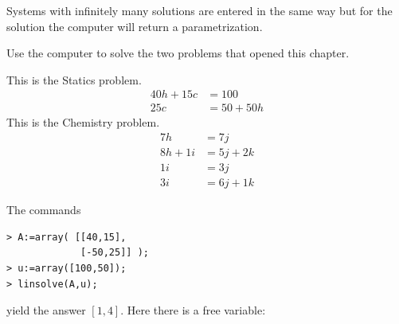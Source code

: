 Systems with infinitely many solutions are entered in the same
way but for the solution the computer will return a parametrization.




\begin{exercises}
  \item 
    Use the computer to solve the two problems that opened this
    chapter.
    \begin{exparts}
      \partsitem This is the Statics problem.
         \begin{align*}
            40h+15c  &= 100  \\
            25c      &= 50+50h
         \end{align*}
      \partsitem This is the Chemistry problem.
         \begin{align*} 
             7h      &= 7j  \\
             8h +1i  &= 5j+2k  \\
             1i      &= 3j  \\
             3i      &= 6j+1k
         \end{align*}
    \end{exparts}
    \begin{answer}
      \begin{exparts}
        \partsitem The commands
\begin{indented}{\small
\begin{verbatim}
> A:=array( [[40,15],
             [-50,25]] );
> u:=array([100,50]);
> linsolve(A,u);
\end{verbatim}
}\end{indented}
           yield the answer $[1,4]$.
        \partsitem Here there is a free variable:

\end{exparts}
\end{answer}
\end{exercises}
